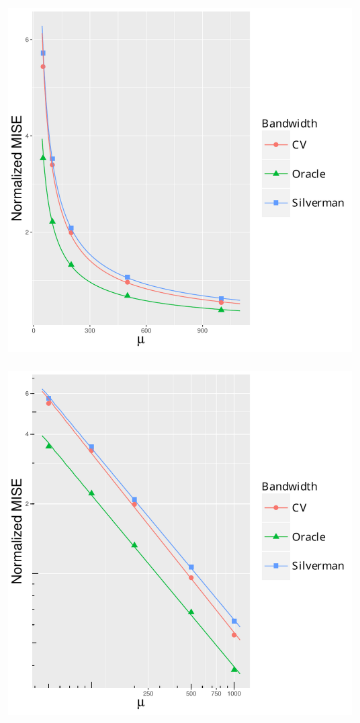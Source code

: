 \begin{figure}[htbp]
\begin{subfigure}[b]{0.24\textwidth}
        \label{fig:ise:unif_NCases_1h:rmise}
    \end{subfigure}
    \begin{subfigure}[b]{0.24\textwidth}
        \includegraphics[width=\textwidth]{results/by_num_cases/NMISE-vs-cases}
        \label{fig:ise:unif_NCases_1h:nmise}
    \end{subfigure}
    \begin{subfigure}[b]{0.24\textwidth}
        \includegraphics[width=\textwidth]{results/by_num_cases/NMISE-vs-cases-log-log}

\end{subfigure}
\end{figure}
